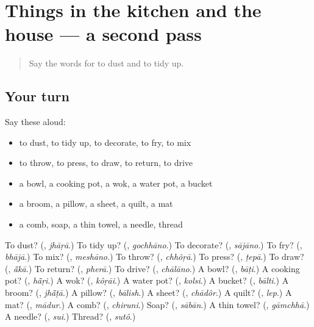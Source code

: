 \section[(dialogue)]{Things in the kitchen and the house — a second pass}

\label{lesson:BN-R109-second-pass-things-in-the-kitchen-and-the-house}



\begin{quote}
Say the words for to dust and to tidy up.
\end{quote}

\subsection*{Your turn}
Say these aloud:

\begin{itemize}
\raggedright
  \item to dust, to tidy up, to decorate, to fry, to mix
  \item to throw, to press, to draw, to return, to drive
  \item a bowl, a cooking pot, a wok, a water pot, a bucket
  \item a broom, a pillow, a sheet, a quilt, a mat
  \item a comb, soap, a thin towel, a needle, thread
\end{itemize}

\begin{tcolorbox}[breakable,colback=teal!4,colframe=teal!35!black,title={Before you move on}]
To dust? (\textbf{}, \emph{jhāṛā}.) To tidy up? (\textbf{}, \emph{gochhāno}.) To decorate? (\textbf{}, \emph{sājāno}.) To fry? (\textbf{}, \emph{bhājā}.) To mix? (\textbf{}, \emph{meshāno}.) To throw? (\textbf{}, \emph{chhõṛā}.) To press? (\textbf{}, \emph{ṭepā}.) To draw? (\textbf{}, \emph{ā̃kā}.) To return? (\textbf{}, \emph{pherā}.) To drive? (\textbf{}, \emph{chālāno}.) A bowl? (\textbf{}, \emph{bāṭi}.) A cooking pot? (\textbf{}, \emph{hā̃ṛi}.) A wok? (\textbf{}, \emph{kôṛāi}.) A water pot? (\textbf{}, \emph{kolsi}.) A bucket? (\textbf{}, \emph{bālti}.) A broom? (\textbf{}, \emph{jhā̃ṭā}.) A pillow? (\textbf{}, \emph{bālish}.) A sheet? (\textbf{}, \emph{chādôr}.) A quilt? (\textbf{}, \emph{lep}.) A mat? (\textbf{}, \emph{mādur}.) A comb? (\textbf{}, \emph{chiruni}.) Soap? (\textbf{}, \emph{sābān}.) A thin towel? (\textbf{}, \emph{gāmchhā}.) A needle? (\textbf{}, \emph{sui}.) Thread? (\textbf{}, \emph{sutô}.)
\end{tcolorbox}
